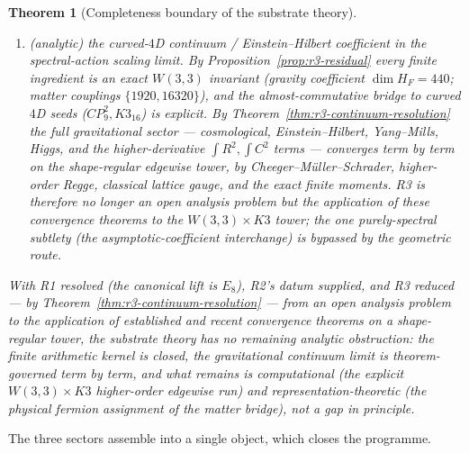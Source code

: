\documentclass[12pt,a4paper]{article}
\def\mathrm#1{#1}%
\def\textbf#1{#1}%
\newtheorem{theorem}{Theorem}[section]
\theoremstyle{definition}
\begin{document}
\begin{theorem}[Completeness boundary of the substrate theory]
\begin{enumerate}[label=(R\arabic*)]
        \emph{degree-only} recursion fixes only $\dim V_5$, not the involution
        traces. \textbf{Datum now supplied}
        (Proposition~\ref{prop:v5-moonshine}): the degree-$5$ McKay--Thompson
        coefficients $\operatorname{Tr}(2A|V_5)=74\,428\,120$,
        $\operatorname{Tr}(2B|V_5)=184\,024$ (validated against the anchored
        head values) furnish exactly the character-theoretic input the lift
        required; what remains is assembling the $V_5$ Monster-module
        decomposition from them.
  \item \textup{(analytic)} the curved-$4$D continuum / Einstein--Hilbert
        coefficient in the spectral-action scaling limit. By
        Proposition~\ref{prop:r3-residual} every \emph{finite} ingredient is an
        exact $W(3,3)$ invariant (gravity coefficient $\dim H_F=440$; matter
        couplings $\{1920,16320\}$), and the almost-commutative bridge to
        curved $4$D seeds ($\mathrm{CP}^2_9,K3_{16}$) is explicit. By
        Theorem~\ref{thm:r3-continuum-resolution} the full gravitational
        sector --- cosmological, Einstein--Hilbert, Yang--Mills, Higgs, and the
        higher-derivative $\int R^2,\int C^2$ terms --- converges term by term
        on the shape-regular edgewise tower, by Cheeger--M\"uller--Schrader,
        higher-order Regge, classical lattice gauge, and the exact finite
        moments. R3 is therefore no longer an open analysis problem but the
        \emph{application} of these convergence theorems to the
        $W(3,3)\times K3$ tower; the one purely-spectral subtlety (the
        asymptotic-coefficient interchange) is bypassed by the geometric route.
\end{enumerate}
With R1 resolved (the canonical lift is $E_8$), R2's datum supplied, and R3
reduced --- by Theorem~\ref{thm:r3-continuum-resolution} --- from an open
analysis problem to the application of established and recent convergence
theorems on a shape-regular tower, the substrate theory has no remaining
\emph{analytic} obstruction: the finite arithmetic kernel is closed, the
gravitational continuum limit is theorem-governed term by term, and what
remains is computational (the explicit $W(3,3)\times K3$ higher-order edgewise
run) and representation-theoretic (the physical fermion assignment of the
matter bridge), not a gap in principle.
\end{theorem}

The three sectors assemble into a single object, which closes the programme.
\end{document}
